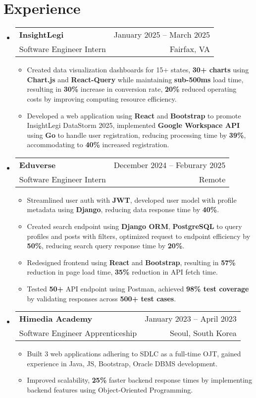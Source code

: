 \documentclass[letterpaper,11pt]{article}
\makeatletter
\newcommand{\resumeItem}[1]{
  \item\small{
    {#1 \vspace{0pt}}
  }
}
\newcommand{\resumeSubheading}[4]{
    \item
    \begin{tabular*}{0.985\textwidth}[t]{l@{\extracolsep{\fill}}r@{\hspace{-0.1in}}}
        \small{\textbf{#1}} & \small{#2} \\
        \small#3 & \small #4 \\
    \end{tabular*}\vspace{-5pt}
}
\newcommand{\resumeSubHeadingListStart}{\begin{itemize}[leftmargin=0.00in, rightmargin=-0.2in, label={}]\vspace{1pt}}
\newcommand{\resumeSubHeadingListEnd}{\end{itemize}\vspace{-7pt}}
\newcommand{\resumeItemListStart}{\begin{itemize}[leftmargin=0.15in, rightmargin=0.15in]}
\newcommand{\resumeItemListEnd}{\end{itemize}\vspace{-7pt}}
\makeatother
\begin{document}
\section{Experience}

\resumeSubHeadingListStart
\resumeSubheading
{InsightLegi} {January 2025 -- March 2025}
{Software Engineer Intern} {Fairfax, VA}
\resumeItemListStart 
\resumeItem{Created data visualization dashboards for 15+ states, \textbf{30+ charts} using \textbf{Chart.js} and \textbf{React-Query} while maintaining \textbf{sub-500ms} load time, resulting in \textbf{30\%} increase in conversion rate, \textbf{20\%} reduced operating costs by improving computing resource efficiency.}
\resumeItem{Developed a web application using \textbf{React} and \textbf{Bootstrap} to promote InsightLegi DataStorm 2025, implemented \textbf{Google Workspace API} using \textbf{Go} to handle user registration, reducing processing time by \textbf{39\%}, accommodating to \textbf{40\%} increased registration.}
\resumeItemListEnd
\resumeSubHeadingListEnd

\resumeSubHeadingListStart
\resumeSubheading
{Eduverse} {December 2024 -- Feburary 2025}
{Software Engineer Intern} {Remote}
\resumeItemListStart
\resumeItem{Streamlined user auth with \textbf{JWT}, developed user model with profile metadata using \textbf{Django}, reducing data response time by \textbf{40\%}.}
\resumeItem{Created search endpoint using \textbf{Django ORM}, \textbf{PostgreSQL} to query profiles and posts with filters, optimized request to endpoint efficiency by \textbf{50\%}, reducing search query response time by \textbf{20\%}.}
\resumeItem{Redesigned frontend using \textbf{React} and \textbf{Bootstrap}, resulting in \textbf{57\%} reduction in page load time, \textbf{35\%} reduction in API fetch time.}
\resumeItem{Tested \textbf{50+} API endpoint using Postman, achieved \textbf{98\% test coverage} by validating responses across \textbf{500+ test cases}.}
\resumeItemListEnd
\resumeSubHeadingListEnd

\resumeSubHeadingListStart
\resumeSubheading
{Himedia Academy} {January 2023 -- April 2023}
{Software Engineer Apprenticeship} {Seoul, South Korea}
\resumeItemListStart
\resumeItem{Built 3 web applications adhering to SDLC as a full-time OJT, gained experience in Java, JS, Bootstrap, Oracle DBMS development.}
\resumeItem{Improved scalability, \textbf{25\%} faster backend response times by implementing backend features using Object-Oriented Programming.}
\resumeItemListEnd
\resumeSubHeadingListEnd
\end{document}
